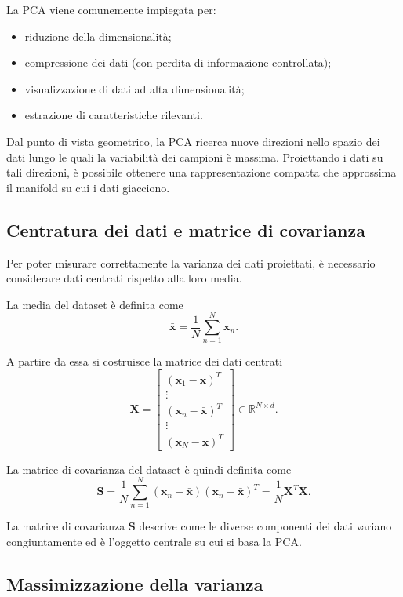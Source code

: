\documentclass[a4paper,12pt]{report}
\begin{document}
La PCA viene comunemente impiegata per:
\begin{itemize}
    \item riduzione della dimensionalità;
    \item compressione dei dati (con perdita di informazione controllata);
    \item visualizzazione di dati ad alta dimensionalità;
    \item estrazione di caratteristiche rilevanti.
\end{itemize}

Dal punto di vista geometrico, la PCA ricerca nuove direzioni nello spazio dei dati lungo le quali la variabilità dei campioni è massima. 
Proiettando i dati su tali direzioni, è possibile ottenere una rappresentazione compatta che approssima il manifold su cui i dati giacciono.

\subsection{Centratura dei dati e matrice di covarianza}

Per poter misurare correttamente la varianza dei dati proiettati, è necessario considerare dati centrati rispetto alla loro media.

La media del dataset è definita come
\[
\bar{\mathbf{x}} = \frac{1}{N} \sum_{n=1}^{N} \mathbf{x}_n.
\]

A partire da essa si costruisce la matrice dei dati centrati
\[
\mathbf{X} =
\begin{bmatrix}
(\mathbf{x}_1 - \bar{\mathbf{x}})^T \\
\vdots \\
(\mathbf{x}_n - \bar{\mathbf{x}})^T \\
\vdots \\
(\mathbf{x}_N - \bar{\mathbf{x}})^T
\end{bmatrix}
\in \mathbb{R}^{N \times d}.
\]

La matrice di covarianza del dataset è quindi definita come
\[
\mathbf{S} = \frac{1}{N} \sum_{n=1}^{N} (\mathbf{x}_n - \bar{\mathbf{x}})(\mathbf{x}_n - \bar{\mathbf{x}})^T
= \frac{1}{N} \mathbf{X}^T \mathbf{X}.
\]

La matrice di covarianza $\mathbf{S}$ descrive come le diverse componenti dei dati variano congiuntamente ed è l'oggetto centrale su cui si basa la PCA.

\subsection{Massimizzazione della varianza}
\end{document}
